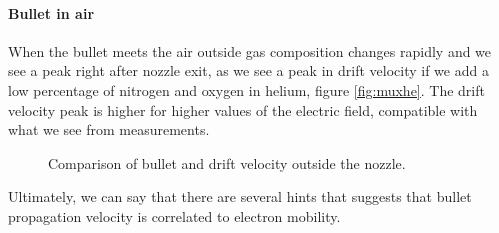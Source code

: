 \paragraph{Bullet in air}
When the bullet meets the air outside gas composition changes rapidly and we see a peak right after nozzle exit, as we see a peak in drift velocity if we add a low percentage of nitrogen and oxygen in helium, figure \ref{fig:muxhe}. The drift velocity peak is higher for higher values of the electric field, compatible with what we see from measurements.
\begin{figure}
 \hfill
 \caption{Comparison of bullet and drift velocity outside the nozzle.}
 \label{fig:muE}
\end{figure}



Ultimately, we can say that there are several hints that suggests that bullet propagation velocity is correlated to electron mobility.
